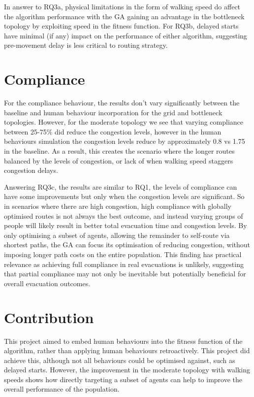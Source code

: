 \documentclass[12pt,a4paper]{report}
\begin{document}
In answer to RQ3a, physical limitations in the form of walking speed do affect the algorithm performance with the GA gaining an advantage in the bottleneck topology by exploiting speed in the fitness function. For RQ3b, delayed starts have minimal (if any) impact on the performance of either algorithm, suggesting pre-movement delay is less critical to routing strategy.

\section{Compliance}
For the compliance behaviour, the results don’t vary significantly between the baseline and human behaviour incorporation for the grid and bottleneck topologies. However, for the moderate topology we see that varying compliance between 25-75\% did reduce the congestion levels, however in the human behaviours simulation the congestion levels reduce by approximately 0.8 vs 1.75 in the baseline. As a result, this creates the scenario where the longer routes balanced by the levels of congestion, or lack of when walking speed staggers congestion delays.

Answering RQ3c, the results are similar to RQ1, the levels of compliance can have some improvements but only when the congestion levels are significant. So in scenarios where there are high congestion, high compliance with globally optimised routes is not always the best outcome, and instead varying groups of people will likely result in better total evacuation time and congestion levels. By only optimising a subset of agents, allowing the remainder to self-route via shortest paths, the GA can focus its optimisation of reducing congestion, without imposing longer path costs on the entire population. This finding has practical relevance as achieving full compliance in real evacuations is unlikely, suggesting that partial compliance may not only be inevitable but potentially beneficial for overall evacuation outcomes.

\section{Contribution}
This project aimed to embed human behaviours into the fitness function of the algorithm, rather than applying human behaviours retroactively. This project did achieve this, although not all behaviours could be optimised against, such as delayed starts. However, the improvement in the moderate topology with walking speeds shows how directly targeting a subset of agents can help to improve the overall performance of the population. 
\end{document}
